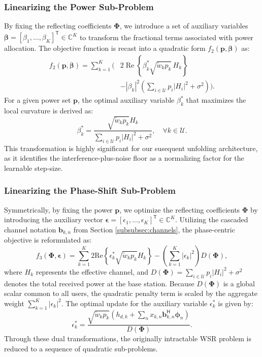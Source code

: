 \documentclass[journal]{IEEEtran}
\newcommand{\herm}{^{\mathsf{H}}}
\newcommand{\trans}{^{\mathsf{T}}}
\begin{document}
\subsubsection{Linearizing the Power Sub-Problem}
By fixing the reflecting coefficients $\mathbf{\Phi}$, we introduce a set of auxiliary variables $\boldsymbol{\beta} = [\beta_1, \dots, \beta_K]\trans \in \mathbb{C}^K$ to transform the fractional terms associated with power allocation. The objective function is recast into a quadratic form $f_2(\mathbf{p}, \boldsymbol{\beta})$ as:
\begin{equation}
\begin{aligned}
f_2(\mathbf{p}, \boldsymbol{\beta})
= \sum_{k=1}^K \Bigg(
&2 \operatorname{Re}\!\left\{
\beta_k^* \sqrt{\tilde{w}_k p_k}\, H_k
\right\} \\
&- |\beta_k|^2
\left(
\sum_{i\in\mathcal{U}} p_i |H_i|^2
+ \sigma^2
\right)
\Bigg).
\end{aligned}
\end{equation}
For a given power set $\mathbf{p}$, the optimal auxiliary variable $\beta_k^*$ that maximizes the local curvature is derived as:
\begin{equation}
    \beta_k^* = \frac{\sqrt{\tilde{w}_k p_k} H_k}{\sum_{i \in \mathcal{U}} p_i |H_i|^2 + \sigma^2}, \quad \forall k \in \mathcal{U}.
\end{equation}
This transformation is highly significant for our susequent unfolding architecture, as it identifies the interference-plus-noise floor as a normalizing factor for the learnable step-size.

\subsubsection{Linearizing the Phase-Shift Sub-Problem}
Symmetrically, by fixing the power $\mathbf{p}$, we optimize the reflecting coefficients $\boldsymbol{\Phi}$ by introducing the auxiliary vector $\boldsymbol{\epsilon} = [\epsilon_1, \dots, \epsilon_K]\trans \in \mathbb{C}^K$. Utilizing the cascaded channel notation $\mathbf{b}_{k,n}$ from Section \ref{subsubsec:channels}, the phase-centric objective is reformulated as:
\begin{equation}
    f_3(\boldsymbol{\Phi}, \boldsymbol{\epsilon}) = \sum_{k=1}^K 2 \text{Re} \left\{ \epsilon_k^* \sqrt{\tilde{w}_k p_k} H_k \right\} - \left( \sum_{k=1}^K |\epsilon_k|^2 \right) D(\boldsymbol{\Phi}),
\end{equation}
where $H_k$ represents the effective channel, and $D(\boldsymbol{\Phi}) = \sum_{i \in \mathcal{U}} p_i |H_i|^2 + \sigma^2$ denotes the total received power at the base station. Because $D(\boldsymbol{\Phi})$ is a global scalar common to all users, the quadratic penalty term is scaled by the aggregate weight $\sum_{k=1}^K |\epsilon_k|^2$. The optimal update for the auxiliary variable $\epsilon_k^*$ is given by:
\begin{equation}
    \epsilon_k^* = \frac{\sqrt{\tilde{w}_k p_k} \left( h_{d,k} + \sum_n x_{k,n} \mathbf{b}_{k,n}\herm \boldsymbol{\phi}_n \right)}{D(\boldsymbol{\Phi})}.
\end{equation}
Through these dual transformations, the originally intractable WSR problem is reduced to a sequence of quadratic sub-problems.
\end{document}
